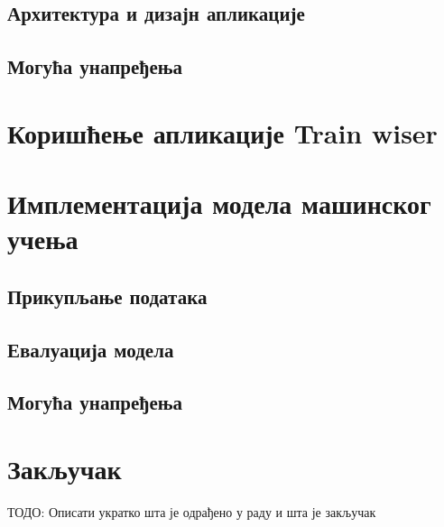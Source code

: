 \documentclass[12pt,oneside]{memoir}
\begin{document}
\section{Архитектура и дизајн апликације}
\section{Могућа унапређења}

\chapter{Коришћење апликације Train wiser}


\chapter{Имплементација модела машинског учења}
\section{Прикупљање података}
\section{Евалуација модела}
\section{Могућа унапређења}



\chapter{Закључак}
ТОДО: Описати укратко шта је одрађено у раду и шта је закључак


\literatura
\nocite{*}


\backmatter

\begin{biografija}
\end{biografija}
\end{document}
